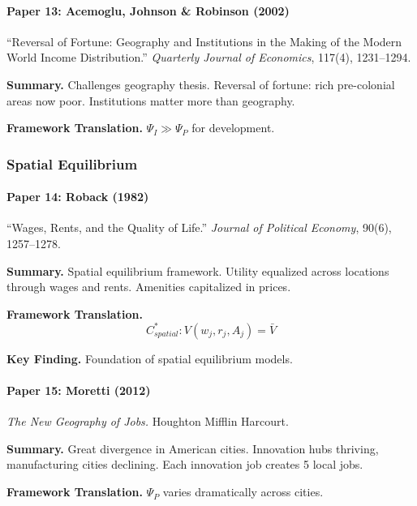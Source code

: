 \paragraph{Paper 13: Acemoglu, Johnson \& Robinson (2002)}

``Reversal of Fortune: Geography and Institutions in the Making of the 
Modern World Income Distribution.''
\textit{Quarterly Journal of Economics}, 117(4), 1231--1294.

\textbf{Summary.}
Challenges geography thesis. Reversal of fortune: rich pre-colonial 
areas now poor. Institutions matter more than geography.

\textbf{Framework Translation.}
$\Psi_I \gg \Psi_P$ for development.

\subsubsection{Spatial Equilibrium}

\paragraph{Paper 14: Roback (1982)}

``Wages, Rents, and the Quality of Life.''
\textit{Journal of Political Economy}, 90(6), 1257--1278.

\textbf{Summary.}
Spatial equilibrium framework. Utility equalized across locations 
through wages and rents. Amenities capitalized in prices.

\textbf{Framework Translation.}
\begin{equation}
C^*_{spatial}: V(w_j, r_j, A_j) = \bar{V}
\end{equation}

\textbf{Key Finding.}
Foundation of spatial equilibrium models.

\paragraph{Paper 15: Moretti (2012)}

\textit{The New Geography of Jobs.}
Houghton Mifflin Harcourt.

\textbf{Summary.}
Great divergence in American cities. Innovation hubs thriving, 
manufacturing cities declining. Each innovation job creates 5 local jobs.

\textbf{Framework Translation.}
$\Psi_P$ varies dramatically across cities.

